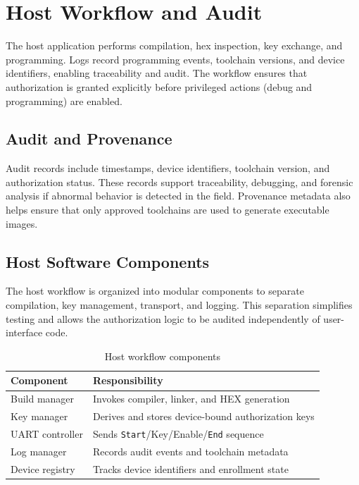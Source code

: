 \section{Host Workflow and Audit}
The host application performs compilation, hex inspection, key exchange, and programming.
Logs record programming events, toolchain versions, and device identifiers, enabling
traceability and audit. The workflow ensures that authorization is granted explicitly
before privileged actions (debug and programming) are enabled.

\subsection{Audit and Provenance}
Audit records include timestamps, device identifiers, toolchain version, and authorization
status. These records support traceability, debugging, and forensic analysis if abnormal
behavior is detected in the field. Provenance metadata also helps ensure that only approved
toolchains are used to generate executable images.

\subsection{Host Software Components}
The host workflow is organized into modular components to separate compilation, key
management, transport, and logging. This separation simplifies testing and allows the
authorization logic to be audited independently of user-interface code.

\begin{table}[H]
  \centering
  \caption{Host workflow components}
  \label{tab:host-components}
  \begin{tabular}{@{}p{4.0cm}p{6.2cm}@{}}
    \toprule
    \textbf{Component} & \textbf{Responsibility} \\
    \midrule
    Build manager & Invokes compiler, linker, and HEX generation \\
    Key manager & Derives and stores device-bound authorization keys \\
    UART controller & Sends \texttt{Start}/Key/Enable/\texttt{End} sequence \\
    Log manager & Records audit events and toolchain metadata \\
    Device registry & Tracks device identifiers and enrollment state \\
    \bottomrule
  \end{tabular}
\end{table}

